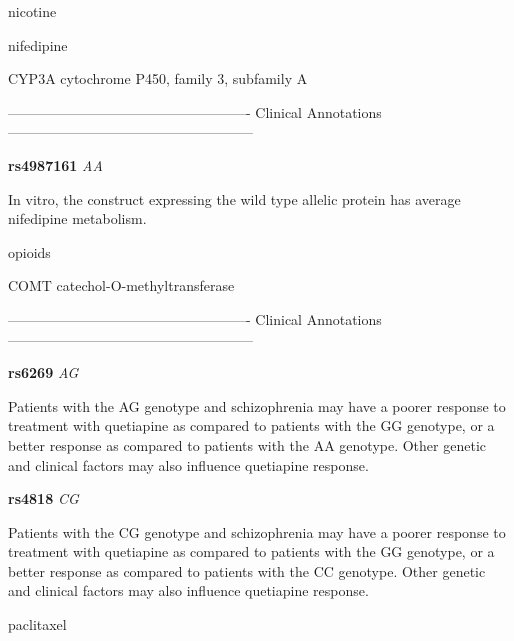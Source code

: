 \documentclass{resume} %
\begin{document}
\begin{rSection}{ nicotine }
\end{rSection}\begin{rSection}{ nifedipine }
\item[]

\begin{rSubsection}{ CYP3A }{ cytochrome P450, family 3, subfamily A }{}{}
\item[]

\item[] ---------------------------------------------------- Clinical Annotations -----------------------------------------------------\newline
\item \textbf{ rs4987161 } \textit{ AA }
\item[] In vitro, the construct expressing the wild type allelic protein has average nifedipine metabolism.
\end{rSubsection}

\end{rSection}\begin{rSection}{ opioids }
\item[]

\begin{rSubsection}{ COMT }{ catechol-O-methyltransferase }{}{}
\item[]

\item[] ---------------------------------------------------- Clinical Annotations -----------------------------------------------------\newline
\item \textbf{ rs6269 } \textit{ AG }
\item[] Patients with the AG genotype and schizophrenia may have a poorer response to treatment with quetiapine as compared to patients with the GG genotype, or a better response as compared to patients with the AA genotype. Other genetic and clinical factors may also influence quetiapine response. \item \textbf{ rs4818 } \textit{ CG }
\item[] Patients with the CG genotype and schizophrenia may have a poorer response to treatment with quetiapine as compared to patients with the GG genotype, or a better response as compared to patients with the CC genotype. Other genetic and clinical factors may also influence quetiapine response. 
\end{rSubsection}

\end{rSection}\begin{rSection}{ paclitaxel }
\item[]


\end{rSection}
\end{document}
